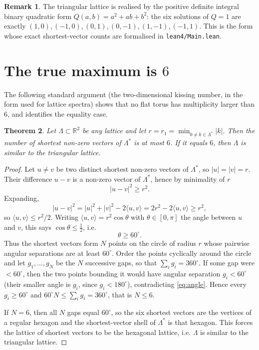 \documentclass[11pt]{article}
\newtheorem{theorem}{Theorem}
\theoremstyle{definition}
\newtheorem{remark}[theorem]{Remark}
\newcommand{\R}{\mathbb{R}}
\newcommand{\Lam}{\Lambda}
\newcommand{\inner}[2]{\langle #1, #2\rangle}
\begin{document}
\begin{remark}
The triangular lattice is realised by the positive definite integral binary
quadratic form $Q(a,b) = a^2 + ab + b^2$: the six solutions of $Q = 1$ are
exactly $(1,0),(-1,0),(0,1),(0,-1),(1,-1),(-1,1)$.  This is the form whose
exact shortest-vector counts are formalised in \texttt{lean4/Main.lean}.
\end{remark}

\section{The true maximum is $6$}\label{sec:max}

The following standard argument (the two-dimensional kissing number, in the
form used for lattice spectra) shows that no flat torus has multiplicity
larger than $6$, and identifies the equality case.

\begin{theorem}\label{thm:max}
Let $\Lam \subset \R^2$ be any lattice and let
$r = r_1 = \min_{0 \neq k \in \Lam^{*}} |k|$.  Then the number of shortest
non-zero vectors of $\Lam^{*}$ is at most $6$.  If it equals $6$, then
$\Lam$ is similar to the triangular lattice.
\end{theorem}

\begin{proof}
Let $u \neq v$ be two distinct shortest non-zero vectors of $\Lam^{*}$, so
$|u| = |v| = r$.  Their difference $u - v$ is a non-zero vector of
$\Lam^{*}$, hence by minimality of $r$
\[
  |u-v|^2 \ge r^2 .
\]
Expanding,
\[
  |u-v|^2 = |u|^2 + |v|^2 - 2\inner{u}{v} = 2r^2 - 2\inner{u}{v} \ge r^2,
\]
so $\inner{u}{v} \le r^2/2$.  Writing $\inner{u}{v} = r^2 \cos\theta$ with
$\theta \in [0,\pi]$ the angle between $u$ and $v$, this says
$\cos\theta \le \tfrac12$, i.e.
\begin{equation}\label{eq:angle}
  \theta \ge 60^{\circ}.
\end{equation}
Thus the shortest vectors form $N$ points on the circle of radius $r$ whose
pairwise angular separations are at least $60^\circ$.  Order the points
cyclically around the circle and let $g_1,\dots,g_N$ be the $N$ successive
gaps, so that $\sum_i g_i = 360^\circ$.  If some gap were $< 60^\circ$, then
the two points bounding it would have angular separation $g_i < 60^\circ$
(their smaller angle is $g_i$, since $g_i < 180^\circ$), contradicting
\eqref{eq:angle}.  Hence every $g_i \ge 60^\circ$ and
$60^\circ N \le \sum_i g_i = 360^\circ$, that is $N \le 6$.

If $N = 6$, then all $N$ gaps equal $60^\circ$, so the six shortest vectors
are the vertices of a regular hexagon and the shortest-vector shell of
$\Lam^{*}$ is that hexagon.  This forces the lattice of shortest vectors to
be the hexagonal lattice, i.e. $\Lam$ is similar to the triangular lattice.
\end{proof}
\end{document}
